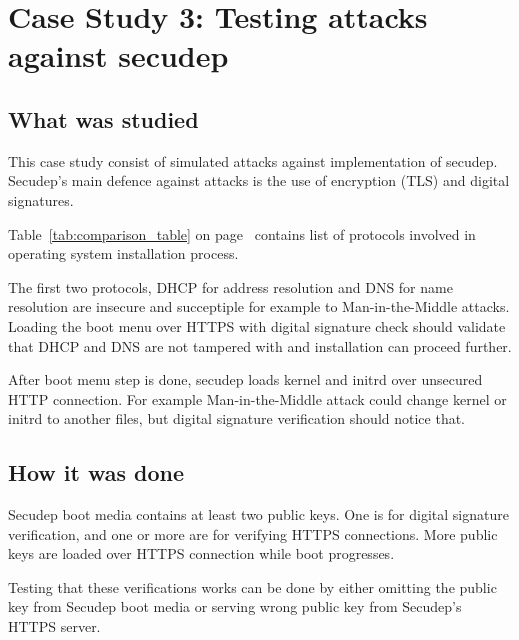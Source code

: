\section{Case Study 3: Testing attacks against secudep}
\label{sec:casestudy3}

\subsection{What was studied}

This case study consist of simulated attacks against implementation of
secudep. Secudep's main defence against attacks is the use of
encryption (TLS) and digital signatures.

Table~\ref{tab:comparison_table} on
page~\pageref{tab:comparison_table} contains list of protocols
involved in operating system installation process.

The first two protocols, DHCP for address resolution and DNS for name
resolution are insecure and succeptiple for example to
Man-in-the-Middle attacks. Loading the boot menu over HTTPS with
digital signature check should validate that DHCP and DNS are not
tampered with and installation can proceed further.

After boot menu step is done, secudep loads kernel and initrd over
unsecured HTTP connection. For example Man-in-the-Middle attack could
change kernel or initrd to another files, but digital signature
verification should notice that.


\subsection{How it was done}

Secudep boot media contains at least two public keys. One is for
digital signature verification, and one or more are for verifying
HTTPS connections. More public keys are loaded over HTTPS connection
while boot progresses.

Testing that these verifications works can be done by either omitting
the public key from Secudep boot media or serving wrong public key
from Secudep's HTTPS server.

